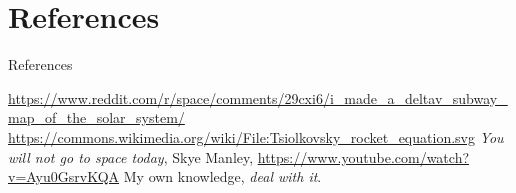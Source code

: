 \documentclass{beamer}
\begin{document}
\section{References}
\begin{frame}{References}
\begin{thebibliography}{9}
     \url{https://www.reddit.com/r/space/comments/29cxi6/i_made_a_deltav_subway_map_of_the_solar_system/}
     \url{https://commons.wikimedia.org/wiki/File:Tsiolkovsky_rocket_equation.svg}
     \textit{You will not go to space today}, Skye Manley, \url{https://www.youtube.com/watch?v=Ayu0GsrvKQA}
     My own knowledge, \textit{deal with it}.
\end{thebibliography}
\end{frame}
\end{document}
